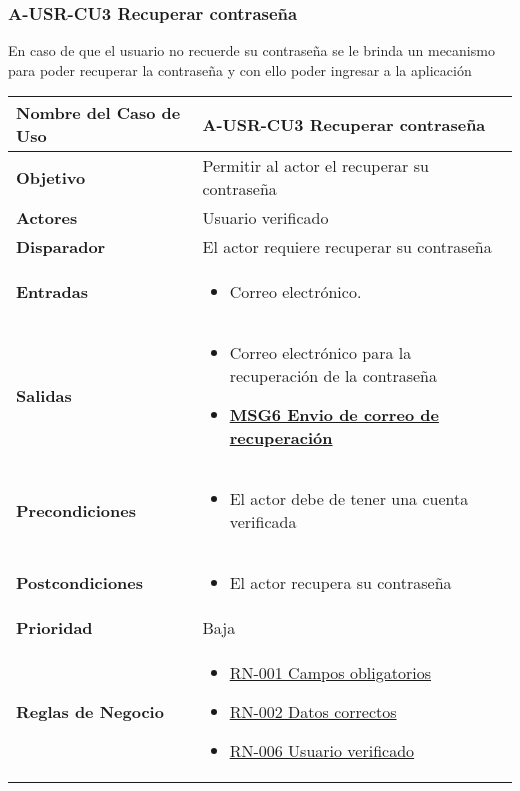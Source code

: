 \subsubsection{A-USR-CU3 Recuperar contraseña}
En caso de que el usuario no recuerde su contraseña se le brinda un mecanismo para poder recuperar la contraseña y con ello poder ingresar a la aplicación
\begin{longtable}{|J{5cm}|J{10.3cm}|}
	\hline
	\textbf{Nombre del Caso de Uso} &
		A-USR-CU3 Recuperar contraseña \\ \hline
	\textbf{Objetivo} &
		Permitir al actor el recuperar su contraseña \\ \hline
	\textbf{Actores} &
		Usuario verificado \\ \hline 
	\textbf{Disparador} & 
		El actor requiere recuperar su contraseña \\ \hline 
	\textbf{Entradas} & 
		\begin{itemize}
				\item Correo electrónico.
		\end{itemize}\\ \hline 
	\textbf{Salidas} &
    	\begin{itemize}
		\item Correo electrónico para la recuperación de la contraseña
		\item \hyperref[MSG6]{\bf MSG6 Envio de correo de recuperación}
		\end{itemize} \\ \hline
	\textbf{Precondiciones} &
		\begin{itemize}
				\item El actor debe de tener una cuenta verificada
		\end{itemize} \\ \hline
	\textbf{Postcondiciones} &
		\begin{itemize}
			\item El actor recupera su contraseña
		\end{itemize}\\ \hline
	\textbf{Prioridad} & 
		Baja \\ \hline
	\textbf{Reglas de Negocio} & 
		\begin{itemize}
			\item \hyperref[RN001]{RN-001 Campos obligatorios}
			\item \hyperref[RN002]{RN-002 Datos correctos}
			\item \hyperref[RN006]{RN-006 Usuario verificado}
		\end{itemize} \\ \hline

\end{longtable}
